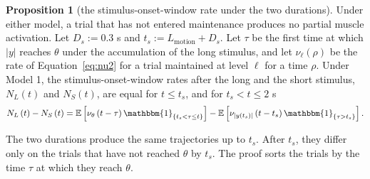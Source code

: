 \documentclass[a4paper,11pt]{article}
\theoremstyle{definition}
\newtheorem{proposition}{Proposition}
\newcommand{\E}{\mathbb E}
\newcommand{\1}{\mathbbm{1}}
\begin{document}
\begin{proposition}[the stimulus-onset-window rate under the two durations]\label{prop:duration}
Under either model, a trial that has not entered maintenance produces no partial muscle activation. Let ${D}_{s}:=0.3$ s and ${t}_{s}:={L}_{\mathrm{motion}}+{D}_{s}$. Let $\tau $ be the first time at which $\left|y\right|$ reaches $\theta $ under the accumulation of the long stimulus, and let ${\nu }_{\ell }\left(\rho \right)$ be the rate of Equation~\eqref{eq:nu2} for a trial maintained at level $\ell $ for a time $\rho $. Under Model 1, the stimulus-onset-window rates after the long and the short stimulus, ${N}_{L}\left(t\right)$ and ${N}_{S}\left(t\right)$, are equal for $t\le {t}_{s}$, and for ${t}_{s}<t\le 2$ s
\begin{equation}
{N}_{L}\left(t\right)-{N}_{S}\left(t\right)=\E\left[{\nu }_{\theta }\left(t-\tau \right){\1}_{\left\{{t}_{s}<\tau \le t\right\}}\right]-\E\left[{\nu }_{\left|y\left({t}_{s}\right)\right|}\left(t-{t}_{s}\right){\1}_{\left\{\tau >{t}_{s}\right\}}\right].
\label{eq:duration}
\end{equation}
\end{proposition}

The two durations produce the same trajectories up to $t_{s}$. After $t_{s}$, they differ only on the trials that have not reached $\theta$ by $t_{s}$. The proof sorts the trials by the time $\tau$ at which they reach $\theta$.
\end{document}
